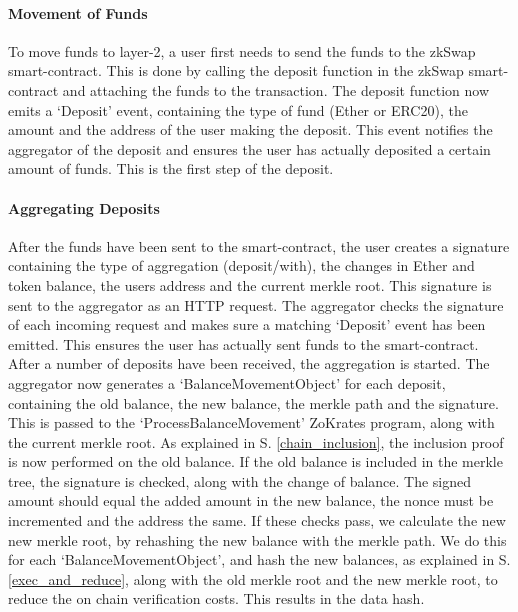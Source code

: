 \documentclass[../../thesis.tex]{subfiles}
\begin{document}
\paragraph{Movement of Funds}
To move funds to layer-2, a user first needs to send the funds to the zkSwap smart-contract. This is done by calling the deposit function in the zkSwap smart-contract and attaching the funds to the transaction. The deposit function now emits a `Deposit' event, containing the type of fund (Ether or ERC20), the amount and the address of the user making the deposit. This event notifies the aggregator of the deposit and ensures the user has actually deposited a certain amount of funds. This is the first step of the deposit.

\paragraph{Aggregating Deposits}
After the funds have been sent to the smart-contract, the user creates a signature containing the type of aggregation (deposit/with), the changes in Ether and token balance, the users address and the current merkle root. This signature is sent to the aggregator as an HTTP request. The aggregator checks the signature of each incoming request and makes sure a matching `Deposit' event has been emitted. This ensures the user has actually sent funds to the smart-contract. After a number of deposits have been received, the aggregation is started. The aggregator now generates a `BalanceMovementObject' for each deposit, containing the old balance, the new balance, the merkle path and the signature. This is passed to the `ProcessBalanceMovement' ZoKrates program, along with the current merkle root. As explained in S. \ref{chain_inclusion}, the inclusion proof is now performed on the old balance. If the old balance is included in the merkle tree, the signature is checked, along with the change of balance. The signed amount should equal the added amount in the new balance, the nonce must be incremented and the address the same. If these checks pass, we calculate the new new merkle root, by rehashing the new balance with the merkle path. We do this for each `BalanceMovementObject', and hash the new balances, as explained in S. \ref{exec_and_reduce}, along with the old merkle root and the new merkle root, to reduce the on chain verification costs. This results in the data hash. 
\end{document}
